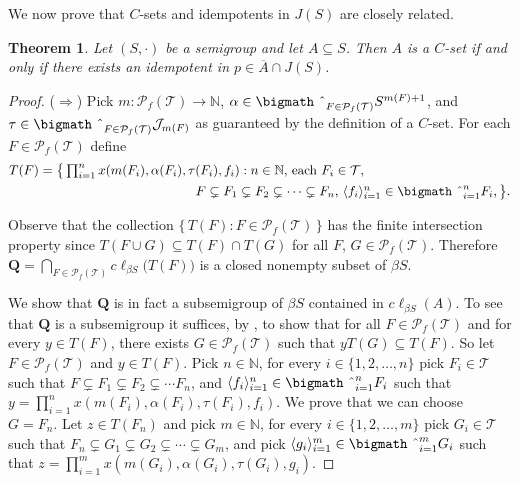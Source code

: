 \documentclass[12pt,showtrims]{memoir}
\theoremstyle{plain}
\newtheorem{thm}{Theorem}[section]
\theoremstyle{definition}
\newcommand{\la}{\langle}
\newcommand{\ra}{\rangle}
\newcommand{\bbN}{\mathbb{N}}
\newcommand{\calJ}{\mathcal{J}}
\newcommand{\calT}{\mathcal{T}}
\newcommand{\Pf}{\mathcal{P}_f}
\newcommand{\bigtimes}{\hbox{\bigmath \char'2}}
\begin{document}
We now prove that $C$-sets and idempotents in $J(S)$ are closely related.
\begin{thm}
  \label{thm:csets}
  Let $(S, \cdot)$ be a semigroup and let $A \subseteq S$. 
  Then $A$ is a $C$-set if and only if there exists an idempotent in $p \in \overline{A} \cap J(S)$.
\end{thm}
\begin{proof}
  ($\Rightarrow$)
  Pick $m \colon \Pf(\calT) \to \bbN$, $\alpha \in \bigtimes_{F \in \Pf(\calT)} S^{m(F)+1}$, and $\tau \in \bigtimes_{F \in \Pf(\calT)} \calJ_{m(F)}$ as guaranteed by the definition of a $C$-set. 
  For each $F \in \Pf(\calT)$ define 
  \begin{align*}
    T(F) &= \bigl\{\, \textstyle \prod_{i=1}^n x(m(F_i), \alpha(F_i), \tau(F_i), f_i) : \mbox{$n \in \bbN$, each $F_i \in \calT$,}\\
 &\hspace{12em}\mbox{$F \subsetneq F_1 \subsetneq F_2 \subsetneq \cdots \subsetneq F_n$, $\la f_i \ra_{i=1}^n \in \bigtimes_{i=1}^n F_i$,} \,\bigr\}.
  \end{align*}

  Observe that the collection $\{\, T(F) : F \in \Pf(\calT) \,\}$ has the finite intersection property since $T(F \cup G) \subseteq T(F) \cap T(G)$ for all $F$, $G \in \Pf(\calT)$.
  Therefore $\mathbf{Q} = \bigcap_{F \in \Pf(\calT)} c\ell_{\beta S}\bigl(T(F)\bigr)$ is a closed nonempty subset of $\beta S$. 

  We show that $\mathbf{Q}$ is in fact a subsemigroup of $\beta S$ contained in $c\ell_{\beta S} (A)$.
  To see that $\mathbf{Q}$ is a subsemigroup it suffices, by \cite[Theorem 4.20]{Hindman:1998fk}, to show that for all $F \in \Pf(\calT)$ and for every $y \in T(F)$, there exists $G \in \Pf(\calT)$ such that $yT(G) \subseteq T(F)$. 
  So let $F \in \Pf(\calT)$ and $y \in T(F)$.
  Pick $n \in \bbN$, for every $i \in \{1, 2, \ldots, n\}$ pick $F_i \in \calT$ such that $F \subsetneq F_1 \subsetneq F_2 \subsetneq \cdots F_n$, and $\la f_i \ra_{i=1}^n \in \bigtimes_{i=1}^n F_i$ such that $y = \prod_{i=1}^n x(m(F_i), \alpha(F_i), \tau(F_i), f_i)$. 
  We prove that we can choose $G = F_n$.
  Let $z \in T(F_n)$ and pick $m \in \bbN$, for every $i \in \{1, 2, \ldots, m\}$ pick $G_i \in \calT$ such that $F_n \subsetneq G_1 \subsetneq G_2 \subsetneq \cdots \subsetneq G_m$, and pick $\la g_i \ra_{i=1}^m \in \bigtimes_{i=1}^m G_i$ such that $z = \prod_{i=1}^m x(m(G_i), \alpha(G_i), \tau(G_i), g_i)$.


\end{proof}
\end{document}
